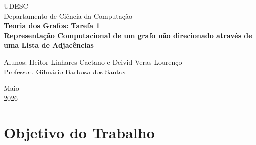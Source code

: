\documentclass[a4paper, 12pt]{article}
\begin{document}

\begin{titlepage}
	\begin{center}
	

		\Huge{UDESC}\\
		\large{Departamento de Ciência da Computação}\\ 
		\vspace{15pt}
        \vspace{95pt}
        \textbf{\LARGE{Teoria dos Grafos: Tarefa 1}}\\

		\textbf{Representação Computacional de um grafo não direcionado através
		de uma Lista de Adjacências}
		\vspace{3,5cm}
	\end{center}
	
	\begin{flushleft}
		\begin{tabbing}
			Alunos: Heitor Linhares Caetano e Deivid Veras Lourenço \\
			Professor: Gilmário Barbosa dos Santos \\
	      \setlength{\labelsep}{\leftmargin}
	\end{tabbing}
 \end{flushleft}
	\vspace{1cm}
	
	\begin{center}
		\vspace{\fill}
			 Maio\\
			 2026
			\end{center}
\end{titlepage}


\newpage
\newpage
\tableofcontents
\thispagestyle{empty}

\newpage
{}

\section{Objetivo do Trabalho}
\end{document}

